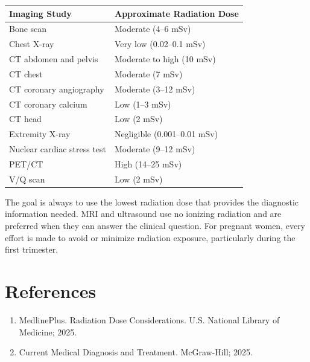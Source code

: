 \begin{longtable}{@{}ll@{}}
\toprule
\textbf{Imaging Study} & \textbf{Approximate Radiation Dose} \\
\midrule
Bone scan & Moderate (4--6 mSv) \\
Chest X-ray & Very low (0.02--0.1 mSv) \\
CT abdomen and pelvis & Moderate to high (10 mSv) \\
CT chest & Moderate (7 mSv) \\
CT coronary angiography & Moderate (3--12 mSv) \\
CT coronary calcium & Low (1--3 mSv) \\
CT head & Low (2 mSv) \\
Extremity X-ray & Negligible (0.001--0.01 mSv) \\
Nuclear cardiac stress test & Moderate (9--12 mSv) \\
PET/CT & High (14--25 mSv) \\
V/Q scan & Low (2 mSv) \\
\bottomrule
\end{longtable}

The goal is always to use the lowest radiation dose that provides the diagnostic information needed. MRI and ultrasound use no ionizing radiation and are preferred when they can answer the clinical question. For pregnant women, every effort is made to avoid or minimize radiation exposure, particularly during the first trimester.

\section*{References}
\begin{enumerate}
  \item MedlinePlus. Radiation Dose Considerations. U.S. National Library of Medicine; 2025.
  \item Current Medical Diagnosis and Treatment. McGraw-Hill; 2025.
\end{enumerate}

